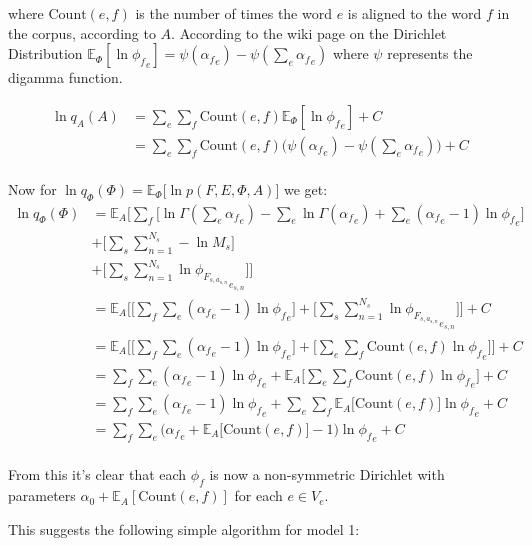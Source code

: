 \documentclass[11pt]{article}
\begin{document}
where $\text{Count}(e, f)$ is the number of times the word $e$ is aligned to the word $f$ in the corpus, according to $A$.
According to the wiki page on the Dirichlet Distribution $\mathbb{E}_\Phi [\ln {\phi_f}_e] = \psi({\alpha_f}_e) - \psi(\sum_e {\alpha_f}_e)$ where $\psi$ represents the digamma function.

\begin{align*}
\ln q_A(A) &= \sum_e \sum_f \text{Count}(e, f) \mathbb{E}_\Phi [\ln {\phi_f}_e] + C \\
&= \sum_e \sum_f \text{Count}(e, f) \big(\psi({\alpha_f}_e) - \psi(\sum_e {\alpha_f}_e)\big) + C \\
\end{align*}

Now for $\ln q_\Phi(\Phi) = \mathbb{E}_\Phi \big[ \ln p(F, E, \Phi, A) \big]$ we get:
\begin{align*}
\ln q_\Phi(\Phi) &= \mathbb{E}_A \bigg[ \sum_f \big[ \ln \Gamma(\sum_e {\alpha_f}_e) - \sum_e \ln \Gamma({\alpha_f}_e) + \sum_e ({\alpha_f}_e - 1) \ln {\phi_f}_e \big] \\
&+ \big[\sum_s \sum_{n=1}^{N_s} -\ln M_s \big]\\
&+ \big[ \sum_s \sum_{n=1}^{N_s} \ln {\phi_{F_{s, a_{s, n}}}}_{e_{s,n}} \big] \bigg] \\
&= \mathbb{E}_A \bigg[ \big[ \sum_f \sum_e ({\alpha_f}_e - 1) \ln {\phi_f}_e \big] + \big[ \sum_s \sum_{n=1}^{N_s} \ln {\phi_{F_{s, a_{s, n}}}}_{e_{s,n}} \big] \bigg] + C \\
&= \mathbb{E}_A \bigg[ \big[ \sum_f \sum_e ({\alpha_f}_e - 1) \ln {\phi_f}_e \big] + \big[ \sum_e \sum_f \text{Count}(e, f) \ln {\phi_f}_e \big] \bigg] + C \\
&= \sum_f \sum_e ({\alpha_f}_e - 1) \ln {\phi_f}_e + \mathbb{E}_A \bigg[ \sum_e \sum_f \text{Count}(e, f) \ln {\phi_f}_e \bigg] + C \\
&= \sum_f \sum_e ({\alpha_f}_e - 1) \ln {\phi_f}_e + \sum_e \sum_f \mathbb{E}_A\big[\text{Count}(e, f)\big] \ln {\phi_f}_e + C \\
&= \sum_f \sum_e \bigg({\alpha_f}_e + \mathbb{E}_A\big[\text{Count}(e, f)\big] - 1\bigg) \ln {\phi_f}_e + C \\
\end{align*}

From this it's clear that each $\phi_f$ is now a non-symmetric Dirichlet with parameters $\alpha_0 + \mathbb{E}_A[\text{Count}(e, f)]$ for each $e \in V_e$.

This suggests the following simple algorithm for model 1:
\end{document}
